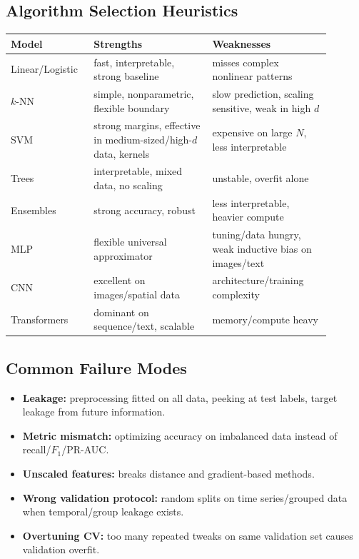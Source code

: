 \documentclass[10pt,twocolumn]{article}
\begin{document}
\subsection{Algorithm Selection Heuristics}
\begin{center}
\renewcommand{\arraystretch}{1.15}
\begin{tabular}{>{\raggedright\arraybackslash}p{0.21\linewidth} >{\raggedright\arraybackslash}p{0.34\linewidth} >{\raggedright\arraybackslash}p{0.34\linewidth}}
\toprule
Model & Strengths & Weaknesses \\
\midrule
Linear/Logistic & fast, interpretable, strong baseline & misses complex nonlinear patterns \\
$k$-NN & simple, nonparametric, flexible boundary & slow prediction, scaling sensitive, weak in high $d$ \\
SVM & strong margins, effective in medium-sized/high-$d$ data, kernels & expensive on large $N$, less interpretable \\
Trees & interpretable, mixed data, no scaling & unstable, overfit alone \\
Ensembles & strong accuracy, robust & less interpretable, heavier compute \\
MLP & flexible universal approximator & tuning/data hungry, weak inductive bias on images/text \\
CNN & excellent on images/spatial data & architecture/training complexity \\
Transformers & dominant on sequence/text, scalable & memory/compute heavy \\
\bottomrule
\end{tabular}
\end{center}

\subsection{Common Failure Modes}
\begin{itemize}
  \item \textbf{Leakage:} preprocessing fitted on all data, peeking at test labels, target leakage from future information.
  \item \textbf{Metric mismatch:} optimizing accuracy on imbalanced data instead of recall/$F_1$/PR-AUC.
  \item \textbf{Unscaled features:} breaks distance and gradient-based methods.
  \item \textbf{Wrong validation protocol:} random splits on time series/grouped data when temporal/group leakage exists.
  \item \textbf{Overtuning CV:} too many repeated tweaks on same validation set causes validation overfit.
\end{itemize}
\end{document}
